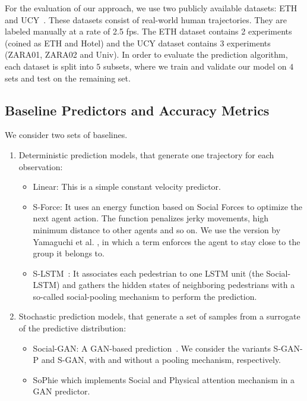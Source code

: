 \documentclass[10pt,twocolumn,letterpaper]{article}
\begin{document}
For the evaluation of our approach, we use two publicly
available datasets: ETH~\cite{Pellegrini2009} and UCY~\cite{CrowdsByExample2007}. These datasets consist of real-world human trajectories. They are labeled manually at a rate of 2.5 fps. The ETH dataset contains 2 experiments (coined as ETH and Hotel) and the UCY dataset contains 3 experiments (ZARA01, ZARA02 and Univ).
In order to evaluate the prediction algorithm, each dataset is split into $5$ subsets, where we train and validate our model on $4$ sets and test on the remaining set. 


\subsection{Baseline Predictors and Accuracy Metrics}
We consider two sets of baselines.
\begin{enumerate}[leftmargin=*]
\item Deterministic prediction models, that generate one trajectory for each observation:

\begin{itemize}[leftmargin=*]
	\item Linear: This is a simple constant velocity predictor.

	\item S-Force: It uses an energy function based on Social Forces to optimize the next agent action. The function penalizes jerky movements, high minimum distance to other agents and so on. We use the version by Yamaguchi et al. \cite{Yamaguchi2011}, in which a term enforces the agent to stay close to the group it belongs to.
	
	\item S-LSTM~\cite{SocialLSTM2016}: It associates each pedestrian to one LSTM unit (the Social-LSTM) and gathers the hidden states of neighboring pedestrians with a so-called social-pooling mechanism to perform the prediction.

\end{itemize}


\item Stochastic prediction models, that generate a set of samples from a surrogate of the predictive distribution:

\begin{itemize}[leftmargin=*]
	\item Social-GAN: A GAN-based prediction~\cite{SocialGAN2018}. We consider the variants S-GAN-P and S-GAN, with and without a pooling mechanism, respectively.
	
	\item SoPhie \cite{SoPhie2018} which implements Social and Physical attention mechanism in a GAN predictor.
\end{itemize}
\end{enumerate}
\end{document}
